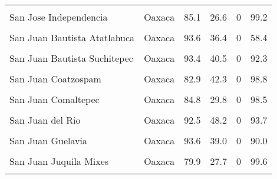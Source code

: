 \documentclass[
]{report}
\begin{document}
\begin{longtable}[t]{llrrrr}
\cellcolor{gray!6}{San Jose Chiltepec} & \cellcolor{gray!6}{Oaxaca} & \cellcolor{gray!6}{90.9} & \cellcolor{gray!6}{44.4} & \cellcolor{gray!6}{0} & \cellcolor{gray!6}{84.6}\\
\addlinespace
San Jose Independencia & Oaxaca & 85.1 & 26.6 & 0 & 99.2\\
\cellcolor{gray!6}{San Juan Achiutla} & \cellcolor{gray!6}{Oaxaca} & \cellcolor{gray!6}{100.0} & \cellcolor{gray!6}{30.7} & \cellcolor{gray!6}{0} & \cellcolor{gray!6}{91.4}\\
San Juan Bautista Atatlahuca & Oaxaca & 93.6 & 36.4 & 0 & 58.4\\
\cellcolor{gray!6}{San Juan Bautista Coixtlahuaca} & \cellcolor{gray!6}{Oaxaca} & \cellcolor{gray!6}{97.0} & \cellcolor{gray!6}{32.0} & \cellcolor{gray!6}{0} & \cellcolor{gray!6}{64.1}\\
San Juan Bautista Suchitepec & Oaxaca & 93.4 & 40.5 & 0 & 92.3\\
\addlinespace
\cellcolor{gray!6}{San Juan Bautista Tlacoatzintepec} & \cellcolor{gray!6}{Oaxaca} & \cellcolor{gray!6}{79.7} & \cellcolor{gray!6}{28.4} & \cellcolor{gray!6}{0} & \cellcolor{gray!6}{98.2}\\
San Juan Coatzospam & Oaxaca & 82.9 & 42.3 & 0 & 98.8\\
\cellcolor{gray!6}{San Juan Colorado} & \cellcolor{gray!6}{Oaxaca} & \cellcolor{gray!6}{89.1} & \cellcolor{gray!6}{32.9} & \cellcolor{gray!6}{0} & \cellcolor{gray!6}{82.4}\\
San Juan Comaltepec & Oaxaca & 84.8 & 29.8 & 0 & 98.5\\
\cellcolor{gray!6}{San Juan Chicomezuchil} & \cellcolor{gray!6}{Oaxaca} & \cellcolor{gray!6}{100.0} & \cellcolor{gray!6}{38.6} & \cellcolor{gray!6}{0} & \cellcolor{gray!6}{97.3}\\
\addlinespace
San Juan del Rio & Oaxaca & 92.5 & 48.2 & 0 & 93.7\\
\cellcolor{gray!6}{San Juan Evangelista Analco} & \cellcolor{gray!6}{Oaxaca} & \cellcolor{gray!6}{98.7} & \cellcolor{gray!6}{25.5} & \cellcolor{gray!6}{0} & \cellcolor{gray!6}{90.9}\\
San Juan Guelavia & Oaxaca & 93.6 & 39.0 & 0 & 90.0\\
\cellcolor{gray!6}{San Juan Guichicovi} & \cellcolor{gray!6}{Oaxaca} & \cellcolor{gray!6}{77.3} & \cellcolor{gray!6}{43.6} & \cellcolor{gray!6}{0} & \cellcolor{gray!6}{83.6}\\
San Juan Juquila Mixes & Oaxaca & 79.9 & 27.7 & 0 & 99.6\\
\addlinespace

\end{longtable}
\end{document}
